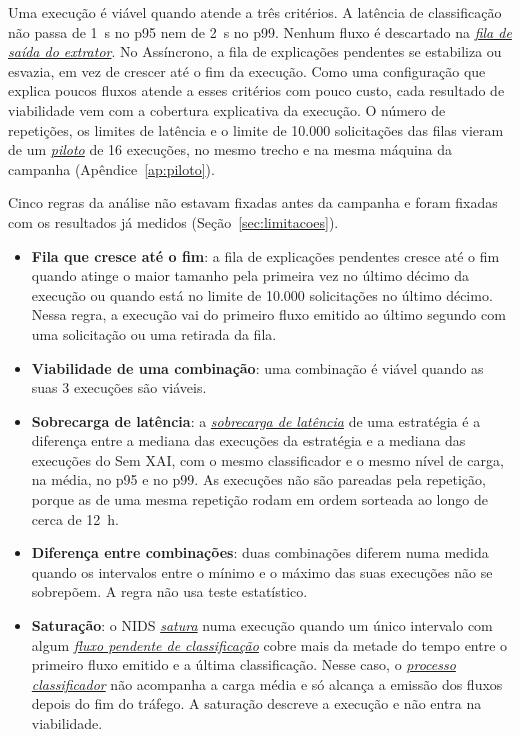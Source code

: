 \documentclass[
  12pt,
  oneside,
  a4paper,
  chapter=TITLE,
  sumario=tradicional,
  english,
  brazil
]{abntex2}
\newcommand{\termo}[2]{\hyperref[gl:#1]{\emph{#2}}}
\begin{document}
Uma execução é viável quando atende a três critérios. A latência de classificação não passa de 1~s
no p95 nem de 2~s no p99. Nenhum fluxo é descartado na \termo{fila-extrator}{fila de saída do
extrator}. No Assíncrono, a fila de explicações pendentes se estabiliza ou esvazia, em vez de crescer
até o fim da execução. Como uma configuração que explica poucos fluxos atende a esses critérios
com pouco custo, cada resultado de viabilidade vem com a cobertura explicativa da execução. O
número de repetições, os limites de latência e o limite de 10.000 solicitações das filas vieram de
um \termo{piloto}{piloto} de 16 execuções, no mesmo trecho e na mesma máquina da campanha
(Apêndice~\ref{ap:piloto}).

Cinco regras da análise não estavam fixadas antes da campanha e foram fixadas com os resultados já
medidos (Seção~\ref{sec:limitacoes}).
\begin{itemize}
  \item \textbf{Fila que cresce até o fim}: a fila de explicações pendentes cresce até o fim quando
  atinge o maior tamanho pela primeira vez no último décimo da execução ou quando está no limite de
  10.000 solicitações no último décimo. Nessa regra, a execução vai do primeiro fluxo emitido ao
  último segundo com uma solicitação ou uma retirada da fila.
  \item \textbf{Viabilidade de uma combinação}: uma combinação é viável quando as suas 3 execuções
  são viáveis.
  \item \textbf{Sobrecarga de latência}: a \termo{sobrecarga}{sobrecarga de latência} de uma
  estratégia é a diferença entre a mediana das execuções da estratégia e a mediana das execuções do
  Sem XAI, com o mesmo classificador e o mesmo nível de carga, na média, no p95 e no p99. As
  execuções não são pareadas pela repetição, porque as de uma mesma repetição rodam em ordem
  sorteada ao longo de cerca de 12~h.
  \item \textbf{Diferença entre combinações}: duas combinações diferem numa medida quando os
  intervalos entre o mínimo e o máximo das suas execuções não se sobrepõem. A regra não usa teste
  estatístico.
  \item \textbf{Saturação}: o NIDS \termo{saturacao}{satura} numa execução quando um único
  intervalo com algum \termo{fluxo-pendente}{fluxo pendente de classificação} cobre mais da metade
  do tempo entre o primeiro fluxo emitido e a última classificação. Nesse caso, o
  \termo{processo-classificador}{processo classificador} não acompanha a carga média e só alcança a
  emissão dos fluxos depois do fim do tráfego. A saturação descreve a execução e não entra na
  viabilidade.
\end{itemize}
\end{document}
